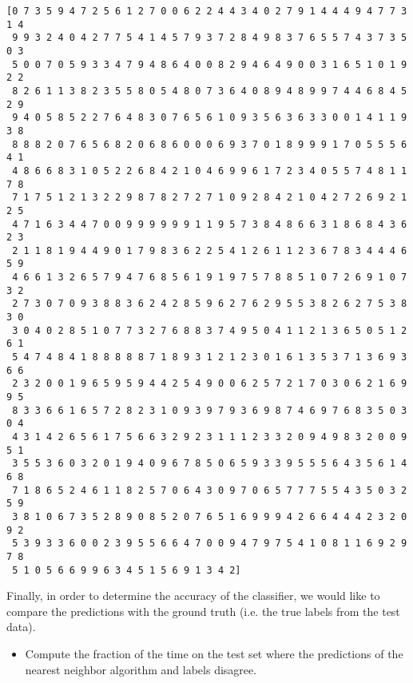\documentclass[11pt]{article}
\providecommand{\tightlist}{%
      \setlength{\itemsep}{0pt}\setlength{\parskip}{0pt}}
\begin{document}
    \begin{Verbatim}[commandchars=\\\{\}]
[0 7 3 5 9 4 7 2 5 6 1 2 7 0 0 6 2 2 4 4 3 4 0 2 7 9 1 4 4 4 9 4 7 7 3 1 4
 9 9 3 2 4 0 4 2 7 7 5 4 1 4 5 7 9 3 7 2 8 4 9 8 3 7 6 5 5 7 4 3 7 3 5 0 3
 5 0 0 7 0 5 9 3 3 4 7 9 4 8 6 4 0 0 8 2 9 4 6 4 9 0 0 3 1 6 5 1 0 1 9 2 2
 8 2 6 1 1 3 8 2 3 5 5 8 0 5 4 8 0 7 3 6 4 0 8 9 4 8 9 9 7 4 4 6 8 4 5 2 9
 9 4 0 5 8 5 2 2 7 6 4 8 3 0 7 6 5 6 1 0 9 3 5 6 3 6 3 3 0 0 1 4 1 1 9 3 8
 8 8 8 2 0 7 6 5 6 8 2 0 6 8 6 0 0 0 6 9 3 7 0 1 8 9 9 9 1 7 0 5 5 5 6 4 1
 4 8 6 6 8 3 1 0 5 2 2 6 8 4 2 1 0 4 6 9 9 6 1 7 2 3 4 0 5 5 7 4 8 1 1 7 8
 7 1 7 5 1 2 1 3 2 2 9 8 7 8 2 7 2 7 1 0 9 2 8 4 2 1 0 4 2 7 2 6 9 2 1 2 5
 4 7 1 6 3 4 4 7 0 0 9 9 9 9 9 9 1 1 9 5 7 3 8 4 8 6 6 3 1 8 6 8 4 3 6 2 3
 2 1 1 8 1 9 4 4 9 0 1 7 9 8 3 6 2 2 5 4 1 2 6 1 1 2 3 6 7 8 3 4 4 4 6 5 9
 4 6 6 1 3 2 6 5 7 9 4 7 6 8 5 6 1 9 1 9 7 5 7 8 8 5 1 0 7 2 6 9 1 0 7 3 2
 2 7 3 0 7 0 9 3 8 8 3 6 2 4 2 8 5 9 6 2 7 6 2 9 5 5 3 8 2 6 2 7 5 3 8 3 0
 3 0 4 0 2 8 5 1 0 7 7 3 2 7 6 8 8 3 7 4 9 5 0 4 1 1 2 1 3 6 5 0 5 1 2 6 1
 5 4 7 4 8 4 1 8 8 8 8 8 7 1 8 9 3 1 2 1 2 3 0 1 6 1 3 5 3 7 1 3 6 9 3 6 6
 2 3 2 0 0 1 9 6 5 9 5 9 4 4 2 5 4 9 0 0 6 2 5 7 2 1 7 0 3 0 6 2 1 6 9 9 5
 8 3 3 6 6 1 6 5 7 2 8 2 3 1 0 9 3 9 7 9 3 6 9 8 7 4 6 9 7 6 8 3 5 0 3 0 4
 4 3 1 4 2 6 5 6 1 7 5 6 6 3 2 9 2 3 1 1 1 2 3 3 2 0 9 4 9 8 3 2 0 0 9 5 1
 3 5 5 3 6 0 3 2 0 1 9 4 0 9 6 7 8 5 0 6 5 9 3 3 9 5 5 5 6 4 3 5 6 1 4 6 8
 7 1 8 6 5 2 4 6 1 1 8 2 5 7 0 6 4 3 0 9 7 0 6 5 7 7 7 5 5 4 3 5 0 3 2 5 9
 3 8 1 0 6 7 3 5 2 8 9 0 8 5 2 0 7 6 5 1 6 9 9 9 4 2 6 6 4 4 4 2 3 2 0 9 2
 5 3 9 3 3 6 0 0 2 3 9 5 5 6 6 4 7 0 0 9 4 7 9 7 5 4 1 0 8 1 1 6 9 2 9 7 8
 5 1 0 5 6 6 9 9 6 3 4 5 1 5 6 9 1 3 4 2]

    \end{Verbatim}

    Finally, in order to determine the accuracy of the classifier, we would
like to compare the predictions with the ground truth (i.e. the true
labels from the test data).

\begin{itemize}
\tightlist
\item
  Compute the fraction of the time on the test set where the predictions
  of the nearest neighbor algorithm and labels disagree.
\end{itemize}
\end{document}
